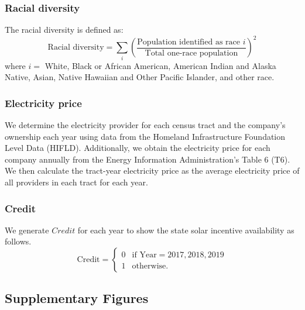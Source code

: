 \documentclass[12pt,twoside,letterpaper]{article}
\begin{document}
\subsubsection*{Racial diversity}
The racial diversity is defined as:
\begin{equation}
\text{Racial diversity} = \sum_{i} (\frac{\text{Population identified as race }i}{\text{Total one-race population}})^2
\end{equation}
where $i = $ White, Black or African American, American Indian and Alaska Native,	Asian, Native Hawaiian and Other Pacific Islander, and other race.

\subsubsection*{Electricity price}
We determine the electricity provider for each census tract and the company's ownership each year using data from the Homeland Infrastructure Foundation Level Data (HIFLD). Additionally, we obtain the electricity price for each company annually from the Energy Information Administration's Table 6 (T6). We then calculate the tract-year electricity price as the average electricity price of all providers in each tract for each year.


\subsubsection*{Credit}
We generate $Credit$ for each year to show the state solar incentive availability as follows.  
\[
\text{Credit} = 
\begin{cases} 
 0 & \text{if } \text{Year} = 2017, 2018, 2019 \\
 1 & \text{otherwise.}
\end{cases} 
\]


\subsection{Supplementary Figures}
\end{document}
